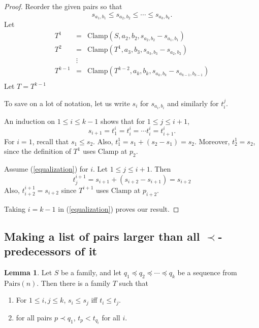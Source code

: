 \documentclass[12pt]{article}
\theoremstyle{definition}
\newtheorem{lemma}[theorem]{Lemma}
\newcommand{\Pairs}{\mbox{Pairs}}
\newcommand{\Clamp}{\mbox{Clamp}}
\begin{document}
\begin{proof}
Reorder the given pairs so that
\[  s_{a_1, b_1} \leq s_{a_2, b_2} \leq \cdots\leq s_{a_k, b_k}.
\]
 Let \[ \begin{array}{lcl}
 T^1  & = &  \Clamp(S,a_2,b_2,s_{a_2, b_2} - s_{a_1, b_1})\\
T^2 & = & \Clamp(T^1,a_3, b_3, s_{a_3, b_3} - s_{a_2, b_2} )\\
  & \vdots   & \\
T^{k-1} & = & \Clamp(T^{k-2},a_k,b_k,
s_{a_k, b_k} - s_{a_{k-1}, b_{k-1}})\\
\end{array}
\]
Let $T = T^{k-1}$

To save on a lot of notation, let us write $s_i$ for $s_{a_i, b_i}$
and similarly for $t^j_i$.

An induction on $1\leq i \leq k -1$ shows that
for $1 \leq j \leq i+1$,
\begin{equation}
\label{equalization}
s_{i+1}  = t^i_{1} = t^i_{i} = \cdots t^i_{i} =  t^i_{i+1}.
\end{equation}
For $i = 1$, recall that $s_1 \leq s_2$.
Also, $t^1_1 = s_1 + (s_2 - s_1) = s_2$.
Moreover, $t^1_2= s_2$, since 
the definition of $T^1$ uses $\Clamp$ at $p_2$.



Assume (\ref{equalization}) for  $i$.
Let   $1\leq j \leq i+1$.
Then \[ t^{i+1}_j = s_{i+1} + (s_{i+2} - s_{i+1}) 
= s_{i+2}\]
Also, $t^{i+1}_{i+2} = s_{i+2} $ since $T^{i+1}$ uses $\Clamp$
at $p_{i+2}$.

Taking $i = k -1$ in (\ref{equalization}) proves our result.
\end{proof}
 
\subsection{Making a list of pairs larger than all $\prec$-predecessors
of it}

\begin{lemma}
Let $S$ be a family, and let $q_1\preceq q_2 \preceq \cdots \preceq q_k$ be a sequence 
from $\Pairs(n)$.  
Then there is a family $T$ such that
\begin{enumerate} 
    \item For $1\leq i,j \leq k$, $s_i \leq s_j$ iff $t_i \leq t_j$.
    \label{competitor1}
    \item for all 
pairs $p \prec q_1$, 
$t_{p}  <  t_{q_i}$ for all $i$.
\label{competitor2}
\end{enumerate}
\label{lemma-competitor}
\end{lemma}
 
\end{document}
